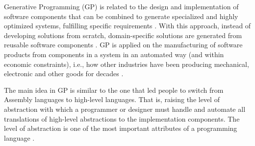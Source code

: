 Generative Programming (GP) is related to the design and implementation of software components that can be combined to generate specialized and highly optimized systems, fulfilling specific requirements \cite{czarnecki1998}. With this approach, instead of developing solutions from scratch, domain-specific solutions are generated from reusable software components \cite{arora2009}. GP is applied on the manufacturing of software products from components in a system in an automated way (and within economic constraints), i.e., how other industries have been producing mechanical, electronic and other goods for decades \cite{barth2002}.


The main idea in GP is similar to the one that led people to switch from Assembly languages to high-level languages. That is, raising the level of abstraction with which a programmer or designer must handle and automate all translations of high-level abstractions to the implementation components. The level of abstraction is one of the most important attributes of a programming language \cite{paska2009}. %

